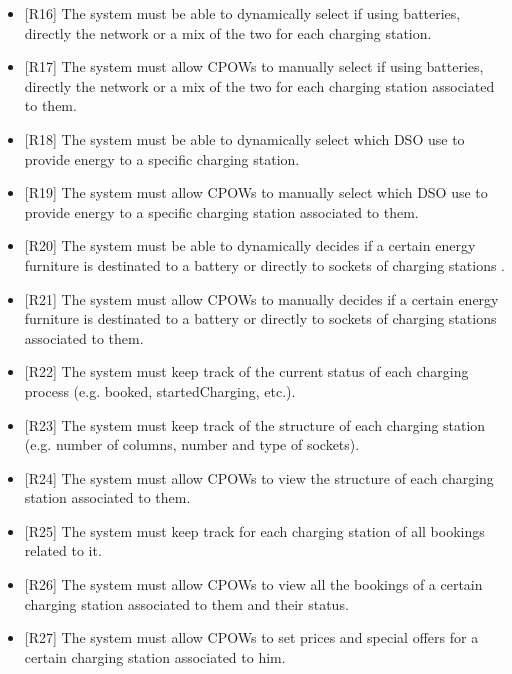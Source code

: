 \documentclass[a4paper]{report}
\begin{document}
\begin{itemize}
    \item{[R16]} \label{R16} The system must be able to dynamically select if using batteries, directly the network or a mix of the two for each charging station.
    \item{[R17]} \label{R17} The system must allow CPOWs to manually select if using batteries, directly the network or a mix of the two for each charging station associated to them.
    \item{[R18]} \label{R18} The system must be able to dynamically select which DSO use to provide energy to a specific charging station.
    \item{[R19]} \label{R19} The system must allow CPOWs to manually select which DSO use to provide energy to a specific charging station associated to them.
    \item{[R20]} \label{R20} The system must be able to dynamically decides if a certain energy furniture is destinated to a battery or directly to sockets of charging stations .
    \item{[R21]} \label{R21} The system must allow CPOWs to manually decides if a certain energy furniture is destinated to a battery or directly to sockets of charging stations associated to them.
    \item{[R22]} \label{R22} The system must keep track of the current status of each charging process (e.g. booked, startedCharging, etc.).
    \item{[R23]} \label{R23} The system must keep track of the structure of each charging station (e.g. number of columns, number and type of sockets).
    \item{[R24]} \label{R24} The system must allow CPOWs to view the structure of each charging station associated to them.
    \item{[R25]} \label{R25} The system must keep track for each charging station of all bookings related to it.
    \item{[R26]} \label{R26} The system must allow CPOWs to view all the bookings of a certain charging station associated to them and their status.
    \item{[R27]} \label{R27} The system must allow CPOWs to set prices and special offers for a certain charging station associated to him.
\end{itemize}
\end{document}
